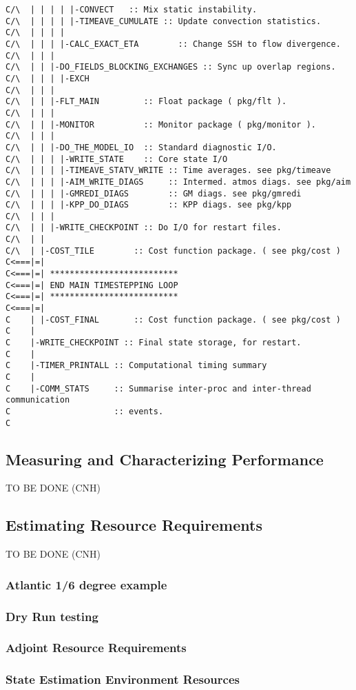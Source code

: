 \begin{verbatim}
C/\  | | | | |-CONVECT   :: Mix static instability.
C/\  | | | | |-TIMEAVE_CUMULATE :: Update convection statistics.
C/\  | | | | 
C/\  | | | |-CALC_EXACT_ETA        :: Change SSH to flow divergence.     
C/\  | | |
C/\  | | |-DO_FIELDS_BLOCKING_EXCHANGES :: Sync up overlap regions.
C/\  | | | |-EXCH                                                   
C/\  | | |
C/\  | | |-FLT_MAIN         :: Float package ( pkg/flt ).
C/\  | | |
C/\  | | |-MONITOR          :: Monitor package ( pkg/monitor ).
C/\  | | |
C/\  | | |-DO_THE_MODEL_IO  :: Standard diagnostic I/O.
C/\  | | | |-WRITE_STATE    :: Core state I/O
C/\  | | | |-TIMEAVE_STATV_WRITE :: Time averages. see pkg/timeave
C/\  | | | |-AIM_WRITE_DIAGS     :: Intermed. atmos diags. see pkg/aim
C/\  | | | |-GMREDI_DIAGS        :: GM diags. see pkg/gmredi
C/\  | | | |-KPP_DO_DIAGS        :: KPP diags. see pkg/kpp
C/\  | | |
C/\  | | |-WRITE_CHECKPOINT :: Do I/O for restart files.
C/\  | |
C/\  | |-COST_TILE        :: Cost function package. ( see pkg/cost )
C<===|=|
C<===|=| **************************
C<===|=| END MAIN TIMESTEPPING LOOP
C<===|=| **************************
C<===|=|
C    | |-COST_FINAL       :: Cost function package. ( see pkg/cost )
C    |
C    |-WRITE_CHECKPOINT :: Final state storage, for restart.
C    |
C    |-TIMER_PRINTALL :: Computational timing summary
C    |
C    |-COMM_STATS     :: Summarise inter-proc and inter-thread communication
C                     :: events.
C 
\end{verbatim}

\subsection{Measuring and Characterizing Performance}

TO BE DONE (CNH)

\subsection{Estimating Resource Requirements}

TO BE DONE (CNH) 

\subsubsection{Atlantic 1/6 degree example}
\subsubsection{Dry Run testing}
\subsubsection{Adjoint Resource Requirements}
\subsubsection{State Estimation Environment Resources}

